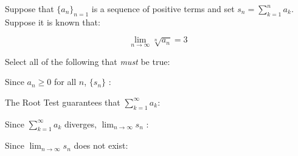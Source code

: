 \documentclass{ximera}
\author{Jim Talamo}
\begin{document}
\begin{exercise}
Suppose that $\{a_n\}_{n=1}$ is a sequence of positive terms and set $s_n = \sum_{k=1}^n a_k$.  Suppose it is known that:

\[
\lim_{n \to \infty} \sqrt[n]{a_n} = 3
\]


Select all of the following that \emph{must} be true:

\begin{selectAll}
\end{selectAll}

\begin{hint}
Since $a_n \geq 0$ for all $n$, $\{s_n\}$ :
\begin{multipleChoice}
\end{multipleChoice}

The Root Test guarantees that $\sum_{k=1}^{\infty} a_k$:

\begin{multipleChoice}
\end{multipleChoice}

\begin{question}

Since $\sum_{k=1}^{\infty} a_k$ diverges, $\lim_{n \to \infty} s_n$ :
\begin{multipleChoice}
\end{multipleChoice}
\begin{question}
Since $\lim_{n \to \infty} s_n$ does not exist:
\begin{multipleChoice}
\end{multipleChoice}

\end{question}
\end{question}

\end{hint}

\end{exercise}
\end{document}

